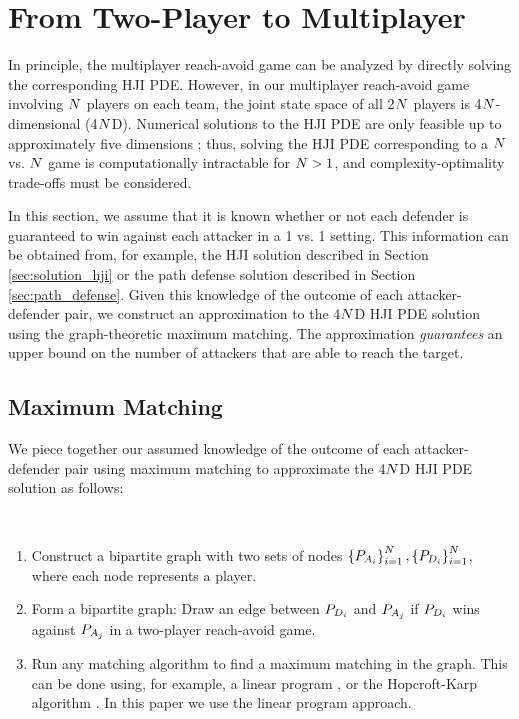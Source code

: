 \section{From Two-Player to Multiplayer} \label{sec:two_to_multi}
In principle, the multiplayer reach-avoid game can be analyzed by directly solving the corresponding HJI PDE. However, in our multiplayer reach-avoid game involving $N$ players on each team, the joint state space of all 2$N$ players is 4$N$-dimensional (4$N$D). Numerical solutions to the HJI PDE are only feasible up to approximately five dimensions \cite{HThesis}; thus, solving the HJI PDE corresponding to a $N$ vs. $N$ game is computationally intractable for $N>1$, and complexity-optimality trade-offs must be considered. 

In this section, we assume that it is known whether or not each defender is guaranteed to win against each attacker in a 1 vs. 1 setting. This information can be obtained from, for example, the HJI solution described in Section \ref{sec:solution_hji} or the path defense solution described in Section \ref{sec:path_defense}. Given this knowledge of the outcome of each attacker-defender pair, we construct an approximation to the 4$N$D HJI PDE solution using the graph-theoretic maximum matching. The approximation \textit{guarantees} an upper bound on the number of attackers that are able to reach the target. 

\subsection{Maximum Matching}
\label{subsec:max_match}
We piece together our assumed knowledge of the outcome of each attacker-defender pair using maximum matching to approximate the 4$N$D HJI PDE solution as follows:

\begin{alg}~
\begin{enumerate}
\item Construct a bipartite graph with two sets of nodes $\left\{P_{A_{i}}\right\}_{i=1}^N,\left\{P_{D_{i}}\right\}_{i=1}^N$, where each node represents a player.
\item Form a bipartite graph: Draw an edge between $P_{D_{i}}$ and $P_{A_{j}}$ if $P_{D_{i}}$ wins against $P_{A_{j}}$ in a two-player reach-avoid game.
\item Run any matching algorithm to find a maximum matching in the graph. This can be done using, for example, a linear program \cite{Schrjiver2004}, or the Hopcroft-Karp algorithm \cite{Karpinski1998}. In this paper we use the linear program approach.
\end{enumerate}
\end{alg}


